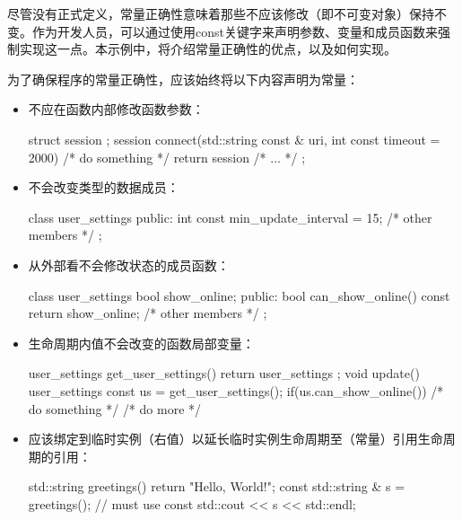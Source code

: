 

尽管没有正式定义，常量正确性意味着那些不应该修改（即不可变对象）保持不变。作为开发人员，可以通过使用const关键字来声明参数、变量和成员函数来强制实现这一点。本示例中，将介绍常量正确性的优点，以及如何实现。


为了确保程序的常量正确性，应该始终将以下内容声明为常量：

\begin{itemize}
\item
不应在函数内部修改函数参数：

\begin{cpp}
struct session {};
session connect(std::string const & uri,
int const timeout = 2000)
{
    /* do something */
    return session { /* ... */ };
}
\end{cpp}

\item
不会改变类型的数据成员：

\begin{cpp}
class user_settings
{
    public:
    int const min_update_interval = 15;
    /* other members */
};
\end{cpp}

\item
从外部看不会修改状态的成员函数：

\begin{cpp}
class user_settings
{
    bool show_online;
public:
    bool can_show_online() const {return show_online;}
    /* other members */
};
\end{cpp}

\item
生命周期内值不会改变的函数局部变量：

\begin{cpp}
user_settings get_user_settings()
{
    return user_settings {};
}
void update()
{
    user_settings const us = get_user_settings();
    if(us.can_show_online()) { /* do something */ }
    /* do more */
}
\end{cpp}

\item
应该绑定到临时实例（右值）以延长临时实例生命周期至（常量）引用生命周期的引用：

\begin{cpp}
std::string greetings()
{
    return "Hello, World!";
}
const std::string & s = greetings(); // must use const
std::cout << s << std::endl;
\end{cpp}
\end{itemize}

